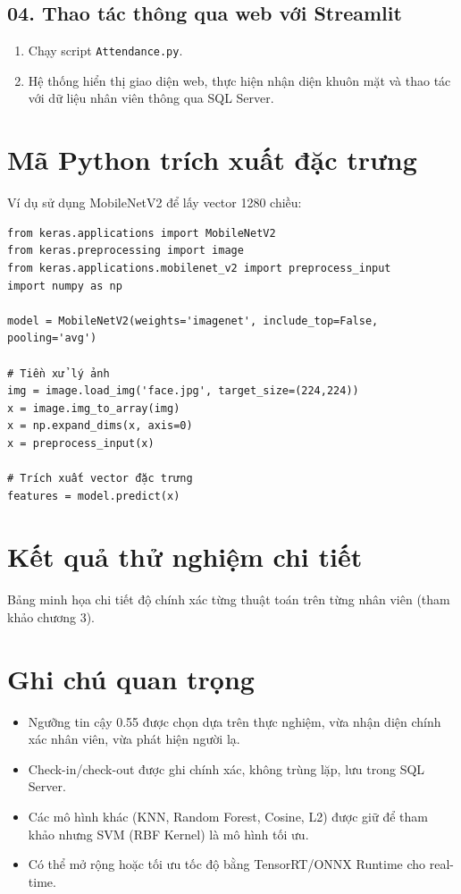 \documentclass[a4paper]{book}
\begin{document}
\subsection*{04. Thao tác thông qua web với Streamlit}
\begin{enumerate}
    \item Chạy script \texttt{Attendance.py}.
    \item Hệ thống hiển thị giao diện web, thực hiện nhận diện khuôn mặt và thao tác với dữ liệu nhân viên thông qua SQL Server.
\end{enumerate}


\section{Mã Python trích xuất đặc trưng}
Ví dụ sử dụng MobileNetV2 để lấy vector 1280 chiều:
\begin{verbatim}
from keras.applications import MobileNetV2
from keras.preprocessing import image
from keras.applications.mobilenet_v2 import preprocess_input
import numpy as np

model = MobileNetV2(weights='imagenet', include_top=False, pooling='avg')

# Tiền xử lý ảnh
img = image.load_img('face.jpg', target_size=(224,224))
x = image.img_to_array(img)
x = np.expand_dims(x, axis=0)
x = preprocess_input(x)

# Trích xuất vector đặc trưng
features = model.predict(x)
\end{verbatim}

\section{Kết quả thử nghiệm chi tiết}
Bảng minh họa chi tiết độ chính xác từng thuật toán trên từng nhân viên (tham khảo chương 3).

\section{Ghi chú quan trọng}
\begin{itemize}
    \item Ngưỡng tin cậy 0.55 được chọn dựa trên thực nghiệm, vừa nhận diện chính xác nhân viên, vừa phát hiện người lạ.
    \item Check-in/check-out được ghi chính xác, không trùng lặp, lưu trong SQL Server.
    \item Các mô hình khác (KNN, Random Forest, Cosine, L2) được giữ để tham khảo nhưng SVM (RBF Kernel) là mô hình tối ưu.
    \item Có thể mở rộng hoặc tối ưu tốc độ bằng TensorRT/ONNX Runtime cho real-time.
\end{itemize}
\end{document}
